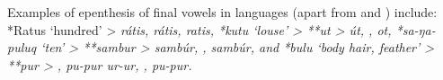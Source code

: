 Examples of epenthesis of final vowels in 
languages (apart from 
and ) include: *Ratus ‘hundred’ >  \it{rátis},
 \it{rátis},  \it{ratis},
*kutu ‘louse’ > **ut >  \it{út},
,  \it{ot}, *sa-ŋa-puluq ‘ten’ > **sambur
>  \it{sambúr}, ,  \it{sambúr},
and *bulu ‘body hair,
feather’ > **pur > ,
\it{pu-pur}  \it{ur-ur}, ,
\it{pu-pur}.
